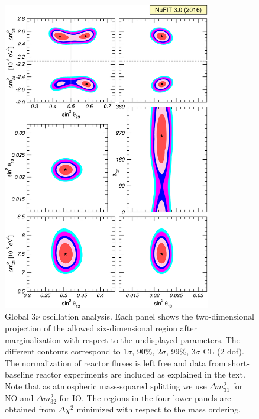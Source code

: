 \documentclass[a4paper, 11pt]{article}
\newcommand{\Dmq}{\Delta m^2}
\newenvironment{pagefigure}{\begin{figure}[!p]}{\afterpage\clearpage\end{figure}}
\begin{document}
\begin{pagefigure}\centering
  \includegraphics[width=0.81\textwidth]{fig-region-glob}
  \caption{Global $3\nu$ oscillation analysis. Each panel shows the
    two-dimensional projection of the allowed six-dimensional region
    after marginalization with respect to the undisplayed
    parameters. The different contours correspond to $1\sigma$, 90\%,
    $2\sigma$, 99\%, $3\sigma$ CL (2 dof).  The normalization of
    reactor fluxes is left free and data from short-baseline reactor
    experiments are included as explained in the text. Note that as
    atmospheric mass-squared splitting we use $\Dmq_{31}$ for NO and
    $\Dmq_{32}$ for IO. The regions in the four lower panels are
    obtained from $\Delta\chi^2$ minimized with respect to the mass
    ordering.}
  \label{fig:region-glob}
\end{pagefigure}
\end{document}
